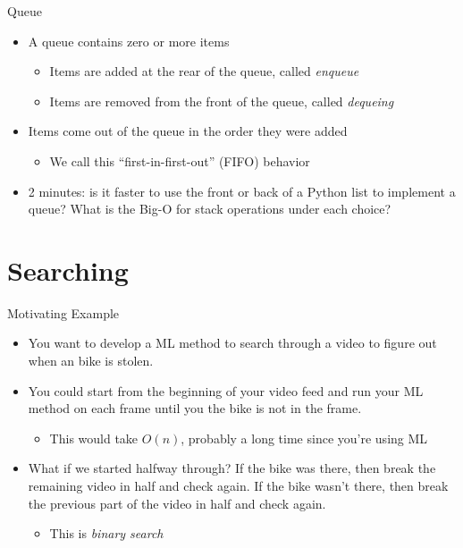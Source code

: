 \documentclass[
  ignorenonframetext,
]{beamer}
\providecommand{\tightlist}{%
  \setlength{\itemsep}{0pt}\setlength{\parskip}{0pt}}\usepackage{longtable,booktabs,array}
\begin{document}
\begin{frame}{Queue}
\protect\hypertarget{queue}{}
\begin{itemize}
\item
  A queue contains zero or more items

  \begin{itemize}
  \item
    Items are added at the rear of the queue, called \emph{enqueue}
  \item
    Items are removed from the front of the queue, called
    \emph{dequeing}
  \end{itemize}
\item
  Items come out of the queue in the order they were added

  \begin{itemize}
  \tightlist
  \item
    We call this ``first-in-first-out'' (FIFO) behavior
  \end{itemize}
\item
  2 minutes: is it faster to use the front or back of a Python list to
  implement a queue? What is the Big-O for stack operations under each
  choice?
\end{itemize}
\end{frame}

\hypertarget{searching}{%
\section{Searching}\label{searching}}

\begin{frame}{Motivating Example}
\protect\hypertarget{motivating-example}{}
\begin{itemize}
\item
  You want to develop a ML method to search through a video to figure
  out when an bike is stolen.
\item
  You could start from the beginning of your video feed and run your ML
  method on each frame until you the bike is not in the frame.

  \begin{itemize}
  \tightlist
  \item
    This would take \(O(n)\), probably a long time since you're using ML
  \end{itemize}
\item
  What if we started halfway through? If the bike was there, then break
  the remaining video in half and check again. If the bike wasn't there,
  then break the previous part of the video in half and check again.

  \begin{itemize}
  \tightlist
  \item
    This is \emph{binary search}
  \end{itemize}
\end{itemize}
\end{frame}
\end{document}
